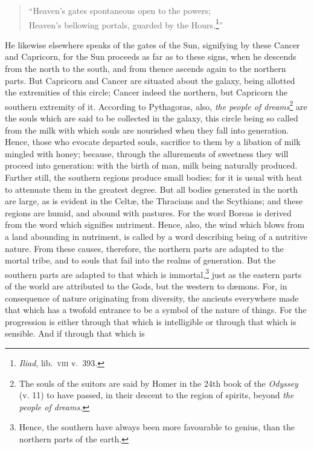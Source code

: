 \documentclass[12pt]{article}
\begin{document}
\begin{verse}
``Heaven's gates spontaneous open to the powers;\\
Heaven's bellowing portals, guarded by the Hours.\footnote{\textit{Iliad}, lib.~\textsc{viii} v.~393.}''
\end{verse}

\noindent He likewise elsewhere speaks of the gates of the Sun, signifying by
these Cancer and Capricorn, for the Sun proceeds as far as to these signs, when
he descends from the north to the south, and from thence ascends again to the
northern parts. But Capricorn and Cancer are situated about the galaxy, being
allotted the extremities of this circle; Cancer indeed the northern, but
Capricorn the southern extremity of it. According to Pythagoras, also,
\textit{the people of dreams}\footnote{The souls of the suitors are said by
Homer in the 24th book of the \textit{Odyssey} (v. 11) to have passed, in their
descent to the region of spirits, beyond \textit{the people of dreams.}} are
the souls which are said to be collected in the galaxy, this circle being so
called from the milk with which souls are nourished when they fall into
generation. Hence, those who evocate departed souls, sacrifice to them by a
libation of milk mingled with honey; because, through the allurements of
sweetness they will proceed into generation: with the birth of man, milk being
naturally produced.  Farther still, the southern regions produce small bodies;
for it is usual with heat to attenuate them in the greatest degree. But all
bodies generated in the north are large, as is evident in the Celt{\ae}, the
Thracians and the Scythians; and these regions are humid, and abound with
pastures. For the word Boreas is derived from the word which signifies
nutriment. Hence, also, the wind which blows from a land abounding in
nutriment, is called by a word describing being of a nutritive nature. From
these causes, therefore, the northern parts are adapted to the mortal tribe,
and to souls that fail into the realms of generation. But the southern parts
are adapted to that which is immortal,\footnote{Hence, the southern have always
been more favourable to genius, than the northern parts of the earth.} just as
the eastern parts of the world are attributed to the Gods, but the western to
d{\ae}mons. For, in consequence of nature originating from diversity, the
ancients everywhere made that which has a twofold entrance to be a symbol of
the nature of things. For the progression is either through that which is
intelligible or through that which is sensible. And if through that which is
\end{document}
